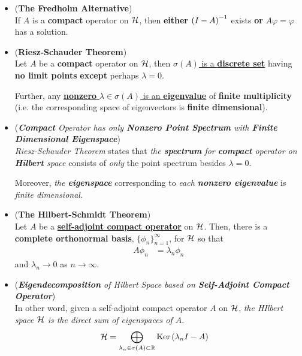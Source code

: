\documentclass[11pt]{article}
\begin{document}
\begin{itemize}
\item \begin{corollary}(\textbf{The Fredholm Alternative}) \citep{reed1980methods}\\
If $A$ is a \textbf{compact} operator on ${\mathcal H}$,  then \textbf{either} $\left(I - A\right)^{-1}$ exists \textbf{or} $Α\varphi = \varphi$ has a solution. 
\end{corollary}

\item \begin{theorem} (\textbf{Riesz-Schauder Theorem})  \citep{reed1980methods}\\
Let $A$ be a \textbf{compact} operator on ${\mathcal H}$, then \underline{$\sigma(A)$ is a \textbf{discrete set}} having \textbf{no limit points} \textbf{except} perhaps 
$\lambda = 0$. 

Further, any \underline{\textbf{nonzero} $\lambda \in \sigma(A)$ is an \textbf{eigenvalue}} of \textbf{finite multiplicity} 
(i.e. the corresponding space of eigenvectors is \textbf{finite dimensional}). 
\end{theorem}

\item \begin{remark} (\emph{\textbf{Compact} Operator has only \textbf{Nonzero Point Spectrum} with \textbf{Finite Dimensional Eigenspace}})\\
\emph{Riesz-Schauder Theorem} states that \emph{the \textbf{spectrum} for \textbf{compact} operator on \textbf{Hilbert} space} consists of \emph{only} the point spectrum besides $\lambda = 0$. 

Moreover, \emph{the \textbf{eigenspace}} corresponding to \emph{each \textbf{nonzero eigenvalue}} is \emph{finite dimensional}.
\end{remark}

\item \begin{theorem} (\textbf{The Hilbert-Schmidt Theorem})  \citep{reed1980methods}\\
Let $A$ be a \underline{\textbf{self-adjoint compact operator}} on ${\mathcal H}$. Then, there is a \textbf{complete orthonormal basis}, $\{\phi_n\}_{n=1}^{\infty}$, for ${\mathcal H}$ so that
\begin{align*}
A \phi_n &= \lambda_n \phi_n 
\end{align*} and $\lambda_n \rightarrow 0$ as $n \rightarrow \infty$.
\end{theorem}

\item \begin{remark} (\emph{\textbf{Eigendecomposition} of Hilbert Space based on \textbf{Self-Adjoint Compact Operator}})\\
In other word, given a self-adjoint compact operator $A$ on ${\mathcal H}$, \emph{the HIlbert space ${\mathcal H}$ is the direct sum of eigenspaces of $A$}.
\begin{align*}
{\mathcal H} &= \bigoplus_{\lambda_n \in \sigma(A) \subset {\mathbb R}}\text{Ker}\left(\lambda_n I - A\right)
\end{align*}


\end{remark}
\end{itemize}
\end{document}
